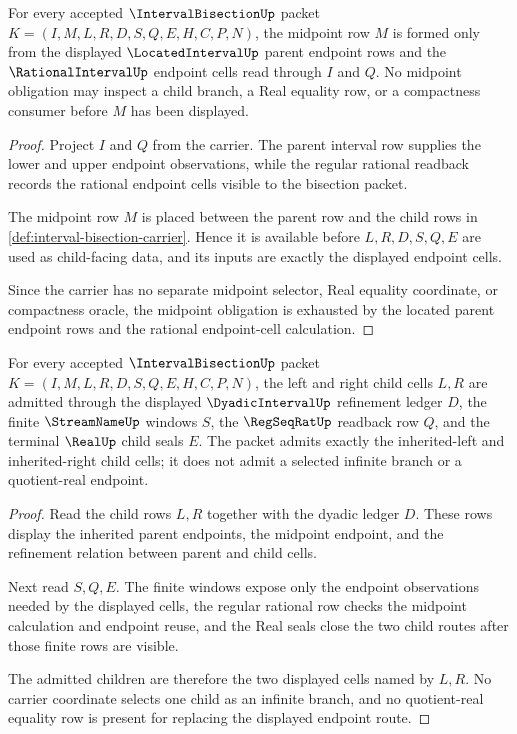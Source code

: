 \begin{theorem}
\label{thm:interval-bisection-midpoint-formation}
For every accepted $\IntervalBisectionUp$ packet $K=(I,M,L,R,D,S,Q,E,H,C,P,N)$, the midpoint row $M$ is formed only from the displayed $\LocatedIntervalUp$ parent endpoint rows and the $\RationalIntervalUp$ endpoint cells read through $I$ and $Q$. No midpoint obligation may inspect a child branch, a Real equality row, or a compactness consumer before $M$ has been displayed.
\end{theorem}
\begin{proof}
Project $I$ and $Q$ from the carrier. The parent interval row supplies the lower and upper endpoint observations, while the regular rational readback records the rational endpoint cells visible to the bisection packet.

The midpoint row $M$ is placed between the parent row and the child rows in \autoref{def:interval-bisection-carrier}. Hence it is available before $L,R,D,S,Q,E$ are used as child-facing data, and its inputs are exactly the displayed endpoint cells.

Since the carrier has no separate midpoint selector, Real equality coordinate, or compactness oracle, the midpoint obligation is exhausted by the located parent endpoint rows and the rational endpoint-cell calculation.
\end{proof}

\begin{theorem}
\label{thm:interval-bisection-child-cell-admission}
For every accepted $\IntervalBisectionUp$ packet $K=(I,M,L,R,D,S,Q,E,H,C,P,N)$, the left and right child cells $L,R$ are admitted through the displayed $\DyadicIntervalUp$ refinement ledger $D$, the finite $\StreamNameUp$ windows $S$, the $\RegSeqRatUp$ readback row $Q$, and the terminal $\RealUp$ child seals $E$. The packet admits exactly the inherited-left and inherited-right child cells; it does not admit a selected infinite branch or a quotient-real endpoint.
\end{theorem}
\begin{proof}
Read the child rows $L,R$ together with the dyadic ledger $D$. These rows display the inherited parent endpoints, the midpoint endpoint, and the refinement relation between parent and child cells.

Next read $S,Q,E$. The finite windows expose only the endpoint observations needed by the displayed cells, the regular rational row checks the midpoint calculation and endpoint reuse, and the Real seals close the two child routes after those finite rows are visible.

The admitted children are therefore the two displayed cells named by $L,R$. No carrier coordinate selects one child as an infinite branch, and no quotient-real equality row is present for replacing the displayed endpoint route.
\end{proof}

